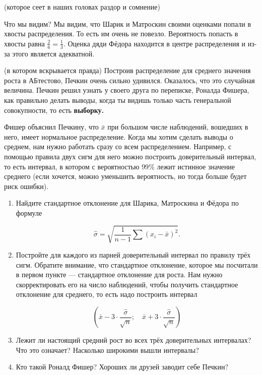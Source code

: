 \documentclass[12pt, a4paper, oneside]{article}
\theoremstyle{plain} %
\theoremstyle{definition}
\newcommand{\indef}[1]{\textbf{ \color{green} #1}}
\begin{document}
\begin{problem}{(которое сеет в наших головах раздор и сомнение)}
\begin{solution}
Что мы видим? Мы видим, что Шарик и Матроскин своими оценками попали в хвосты распределения. То есть им очень не повезло.  Вероятность попасть в хвосты равна $\frac{2}{6} = \frac{1}{3}$. Оценка дяди Фёдора находится в центре распределения и из-за этого является адекватной. 
\end{solution}


\begin{problem}{(в котором вскрывается правда)}
Построив распределение для среднего значения роста в АБтестово, Печкин очень сильно удивился. Оказалось, что это случайная величина. Печкин решил узнать у своего друга по переписке, Роналда Фишера, как правильно делать выводы, когда ты видишь только часть генеральной совокупности, то есть \indef{выборку.}

Фишер объяснил Печкину, что $\bar x$ при большом числе наблюдений, вошедших в него, имеет нормальное распределение. Когда мы хотим сделать выводы о среднем, нам нужно работать сразу со всем распределением. Например, с помощью правила двух сигм для него можно построить доверительный интервал, то есть интервал, в котором с вероятностью $99\%$ лежит истинное значение среднего (если хочется, можно уменьшить вероятность, но тогда больше будет риск ошибки).  

\begin{enumerate}
	\item[а)] Найдите стандартное отклонение для Шарика, Матроскина и Фёдора по формуле 
	
	\[\hat \sigma = \sqrt{ \frac{1}{n-1}  \sum (x_i - \bar x)^2}.\]
	
	\item[б)] Постройте для каждого из парней доверительный интервал по правилу трёх сигм. Обратите внимание, что стандартное отклонение, которое мы посчитали в первом пункте --- стандартное отклонение для роста. Нам нужно скорректировать его на число наблюдений, чтобы получить стандартное отклонение для среднего, то есть надо построить интервал
	
	\[ \left( \bar x - 3 \cdot \frac{\hat \sigma}{\sqrt{n}}; \quad \bar x + 3 \cdot \frac{\hat \sigma}{\sqrt{n}} \right)\] 
	
	\item[в)] Лежит ли настоящий средний рост во всех трёх доверительных интервалах? Что это означает? Насколько широкими вышли интервалы? 
		
	\item[г)] Кто такой Роналд Фишер? Хороших ли друзей заводит себе Печкин?
\end{enumerate}
\end{problem}


\end{problem}
\end{document}
